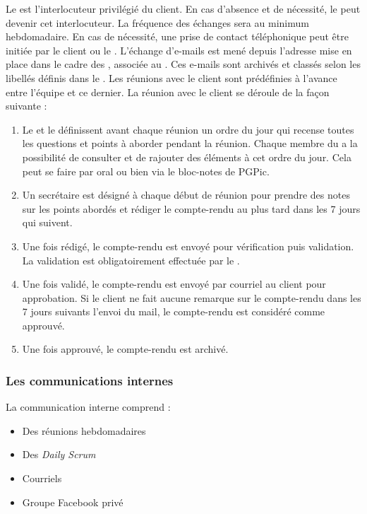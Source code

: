 Le \CP est l’interlocuteur privilégié du client. En cas d’absence et de nécessité, le \CPA peut devenir cet interlocuteur. La fréquence des échanges sera au minimum hebdomadaire. En cas de nécessité, une prise de contact téléphonique peut être initiée par
le client ou le \CP. L’échange d’e-mails est mené depuis l’adresse mise en place dans le cadre des \PICCourt, associée au \CP. Ces e-mails sont archivés et classés selon les libellés définis dans le \PGC. Les réunions avec le client sont prédéfinies à l’avance entre l’équipe \PICCourt et ce dernier. La réunion avec le client se déroule de la façon suivante :
\begin{enumerate}
\item Le \CP et le \CPA définissent avant chaque réunion un ordre du jour qui recense toutes les questions et points à aborder pendant la réunion. Chaque membre du \PICCourt a la possibilité de consulter et de rajouter des éléments à cet ordre du jour. Cela peut se faire par oral ou bien via le bloc-notes de PGPic.
\item Un secrétaire est désigné à chaque début de réunion pour prendre des notes sur les points abordés et rédiger le compte-rendu au plus tard dans les 7 jours qui suivent.
\item Une fois rédigé, le compte-rendu est envoyé pour vérification puis validation. La validation est obligatoirement effectuée par le \CP.
\item Une fois validé, le compte-rendu est envoyé par courriel au client pour approbation. Si le client ne fait aucune remarque sur le compte-rendu dans les 7 jours suivants l’envoi du mail, le compte-rendu est considéré comme approuvé.
\item Une fois approuvé, le compte-rendu est archivé.
\end{enumerate}


\subsubsection*{Les communications internes}

La communication interne comprend :
\begin{itemize}
\item Des réunions hebdomadaires
\item Des \textit{Daily Scrum}
\item Courriels
\item Groupe Facebook privé \\
\end{itemize}

